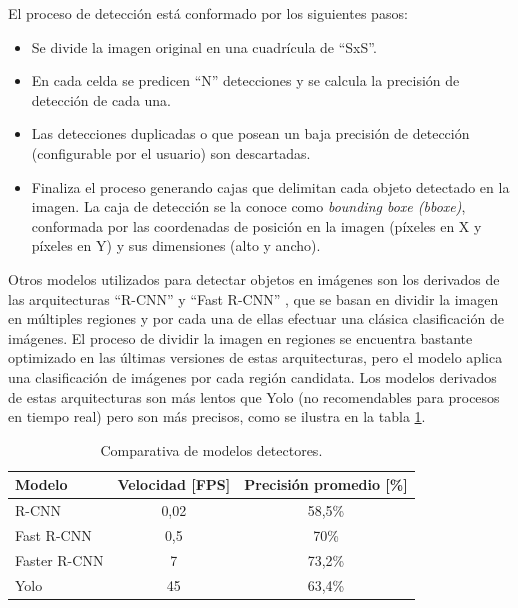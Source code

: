 
El proceso de detección está conformado por los siguientes pasos:

\begin{itemize}
\item Se divide la imagen original en una cuadrícula de ``SxS''.
\item En cada celda se predicen ``N'' detecciones y se calcula la precisión de detección de cada una.
\item Las detecciones duplicadas o que posean un baja precisión de detección (configurable por el usuario) son descartadas.
\item Finaliza el proceso generando cajas que delimitan cada objeto detectado en la imagen. La caja de detección se la conoce como \textit{bounding boxe (bboxe)}, conformada por las coordenadas de posición en la imagen (píxeles en X y píxeles en Y) y sus dimensiones (alto y ancho).

\end{itemize}


Otros modelos utilizados para detectar objetos en imágenes son los derivados de las arquitecturas ``R-CNN'' y ``Fast R-CNN'' \citep{RCNN}, que se basan en dividir la imagen en múltiples regiones y por cada una de ellas efectuar una clásica clasificación de imágenes. El proceso de dividir la imagen en regiones se encuentra bastante optimizado en las últimas versiones de estas arquitecturas, pero el modelo aplica una clasificación de imágenes por cada región candidata. Los modelos derivados de estas arquitecturas son más lentos que Yolo (no recomendables para procesos en tiempo real) pero son más precisos, como se ilustra en la tabla \ref{tab:comparativaDetectores}.

\begin{table}[h]
	\centering
	\caption[Comparativa de modelos detectores]{Comparativa de modelos detectores.}
	\begin{tabular}{l c c}    
		\toprule
		\textbf{Modelo}   & \textbf{Velocidad [FPS]} & \textbf{Precisión promedio [\%]} \\
		\midrule
		R-CNN & 0,02 & 58,5\% \\
		Fast R-CNN & 0,5 & 70\% \\
		Faster R-CNN & 7 & 73,2\% \\
		Yolo & 45 & 63,4\% \\
		\bottomrule
		\hline
	\end{tabular}
	\label{tab:comparativaDetectores}
\end{table}

